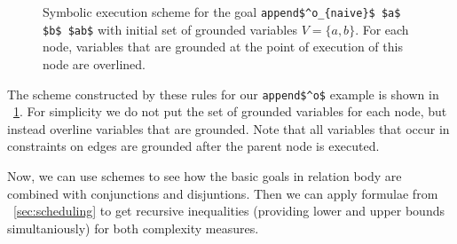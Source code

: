 \begin{figure}[t]
\begin{center}
\end{center}

\caption{Symbolic execution scheme for the goal  \lstinline|append$^o_{naive}$ $a$ $b$ $ab$|  with initial set of grounded variables $V = \{ a, b \}$. For each node, variables that are grounded at the point of execution of this node are overlined. }
\label{fig:example_scheme}
\end{figure}

The scheme constructed by these rules for our \lstinline|append$^o$| example is shown in \figureword~\ref{fig:example_scheme}. For simplicity we do not put the set of grounded variables for each node, but instead overline variables that are grounded. Note that all variables that occur in constraints on edges are grounded after the parent node is executed.

Now, we can use schemes to see how the basic goals in relation body are combined with conjunctions and disjuntions. Then we can apply formulae from \sectionword~\ref{sec:scheduling} to get recursive inequalities (providing lower and upper bounds simultaniously) for both complexity measures.


